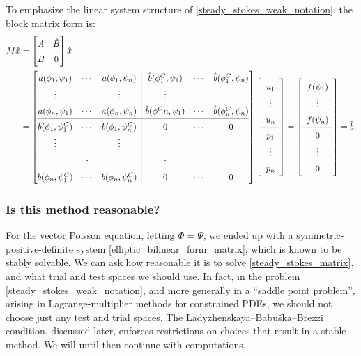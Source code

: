 \documentclass[11pt,a4paper]{memoir}
\begin{document}
To emphasize the linear system structure of \eqref{steady_stokes_weak_notation}, the block matrix form is:
\begin{equation}\label{steady_stokes_matrix}
\def\arraystretch{1.5}
\begin{split}
    M\hat{x}
    &= \begin{bmatrix}
            A & \hat{B} \\
            B & 0
    \end{bmatrix}\hat{x} \\
    &= \left[\begin{array}{@{}ccc|ccc@{}}
            a(\phi_1, \psi_1) & \cdots & a(\phi_1, \psi_n)     & \hat{b}(\phi^C_1, \psi_1) & \cdots & \hat{b}(\phi^C_1, \psi_n) \\
            \vdots & & \vdots                                  & \vdots & & \vdots \\
            a(\phi_n, \psi_1) & \cdots & a(\phi_n, \psi_n)     & \hat{b}(\phi^Cn, \psi_1) & \cdots & \hat{b}(\phi^C_n, \psi_n) \\
            \hline
            b(\phi_1, \psi^C_1) & \cdots & b(\phi_1, \psi^C_n) & 0 &\cdots& 0      \\
            \vdots & & \vdots \\                               & \vdots & & \vdots \\
            b(\phi_n, \psi^C_1) & \cdots & b(\phi_n, \psi^C_n) & 0 &\cdots& 0       
    \end{array}\right]
    \left[\begin{array}{c} u_1 \\ \vdots \\ u_n \\ \hline p_1 \\ \vdots \\ p_n \end{array}\right]
    =
    \left[\begin{array}{c} f(\psi_1) \\ \vdots \\ f(\psi_{n}) \\ \hline 0 \\ \vdots \\ 0 \end{array}\right]
    = \hat{b}.
\end{split}
\end{equation}
\subsubsection{Is this method reasonable?}
For the vector Poisson equation, letting $\Phi = \Psi$, we ended up with a symmetric-positive-definite system \eqref{elliptic_bilinear_form_matrix}, which is known to be stably solvable.
We can ask how reasonable it is to solve \eqref{steady_stokes_matrix}, and what trial and test spaces we should use.
In fact, in the problem \eqref{steady_stokes_weak_notation}, and more generally in a ``saddle point problem'', arising
in Lagrange-multiplier methods for constrained PDEs, we should not choose just any test and trial spaces.
The Ladyzhenskaya--Babu\v{s}ka--Brezzi condition, discussed later, enforces restrictions on choices that result in a stable method.
We will until then continue with computations.
\end{document}
